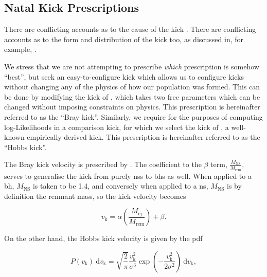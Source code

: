 \subsection{Natal Kick Prescriptions}\label{sec:natal_kick_prescriptions}

\alice

There are conflicting accounts as to the cause of the kick \citep[see, for example,][]{Fryer:1998, Arzoumanian:2002, Bombaci:2004, Hobbs:2005, Bray:2016, Verbunt:2017}. There are conflicting accounts as to the form and distribution of the kick too, as discussed in, for example, \citet{Blaauw:1961, Gunn:1970, De_loore:1975, Sutantyo:1978, Hobbs:2005, Baker:2008, Wongwathanarat:2013, Bray:2018, Giacobbo:2020, Mandel:2020}.

We stress that we are not attempting to prescribe \textit{which} prescription is somehow ``best'', but seek an easy-to-configure kick which allows us to configure kicks without changing any of the physics of how our population was formed. This can be done by modifying the kick of \citet{Bray:2016}, which takes two free parameters which can be changed without imposing constraints on physics. This prescription is hereinafter referred to as the ``Bray kick''. Similarly, we require for the purposes of computing log-Likelihoods in  a comparison kick, for which we select the kick of \citet{Hobbs:2005}, a well-known empirically derived kick. This prescription is hereinafter referred to as the ``Hobbs kick''.

The Bray kick velocity is prescribed by . The coefficient to the $\beta$ term, $\frac{M_\text{NS}}{M_\text{rem}}$, serves to generalise the kick from purely \glspl{ns} to \glspl{bh} as well. When applied to a \gls{bh}, $M_\text{NS}$ is taken to be \SI{1.4}{\msun}, and conversely when applied to a \gls{ns}, $M_\text{NS}$ is by definition the remnant mass, so the kick velocity becomes

\begin{equation}
    v_\text{k} = \alpha\left(\frac{M_\text{ej}}{M_\text{rem}}\right)+\beta.\label{eq:bray_kick}
\end{equation}

On the other hand, the Hobbs kick velocity is given by the \gls{pdf}

\begin{equation}
    P(v_\text{k})~\mathrm{d}v_\text{k} = \sqrt{\frac{2}{\pi}}\frac{v_\text{k}^2}{\sigma^3}\exp\left(-\frac{v_\text{k}^2}{2\sigma^2}\right)~\mathrm{d}v_\text{k},\label{eq:hobbs_kick}
\end{equation}

